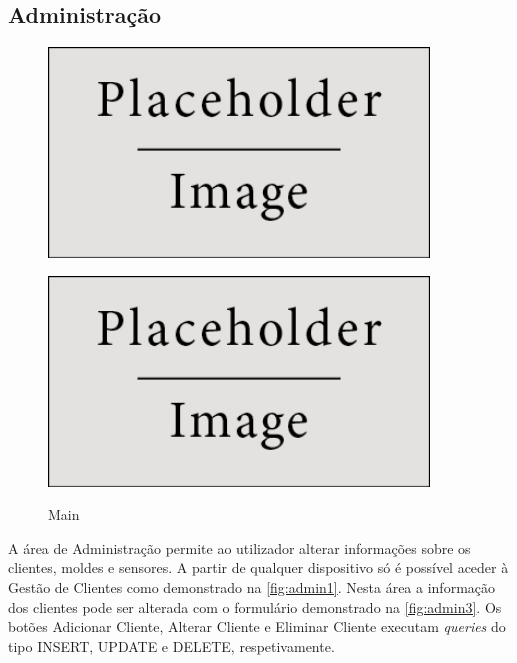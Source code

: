 \documentclass[11pt,twoside,a4paper]{report}
\begin{document}
\subsection{Administração}
\begin{figure}[H]
	\centering
	\begin{minipage}{.5\textwidth}
		\begin{center}
			\includegraphics[width=0.9\textwidth]{placeholder} %
			\label{fig:admin1}
		\end{center}
	\end{minipage}%
	\begin{minipage}{.5\textwidth}
		\begin{center}
			\includegraphics[width=0.9\textwidth]{placeholder} %
			\label{fig:admin2}
		\end{center}
	\end{minipage}
	\caption{Main}
	\label{fig:admin0}
\end{figure}
A área de Administração permite ao utilizador alterar informações sobre os clientes, moldes e sensores. A partir de qualquer dispositivo só é possível aceder à Gestão de Clientes como demonstrado na \autoref{fig:admin1}. Nesta área a informação dos clientes pode ser alterada com o formulário demonstrado na \autoref{fig:admin3}. Os botões Adicionar Cliente, Alterar Cliente e Eliminar Cliente executam \textit{queries} do tipo INSERT, UPDATE e DELETE, respetivamente.\\
\end{document}
